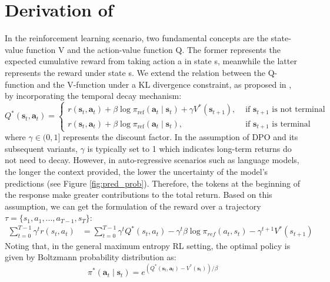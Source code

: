 \section{Derivation of \method}
\label{sec:derivation}
In the reinforcement learning scenario, two fundamental concepts are the state-value function V and the action-value function Q. The former represents the expected cumulative reward from taking action a in state s, meanwhile the latter represents the reward under state s. We extend the relation between the Q-function and the V-function under a KL divergence constraint, as proposed in \citet{rafailov2024fromr}, by incorporating the temporal decay mechanism:
\begin{equation}
    Q^*\left(\mathbf{s}_t, \mathbf{a}_t\right)= \begin{cases}r\left(\mathbf{s}_t, \mathbf{a}_t\right)+\beta \log \pi_{\mathrm{ref}}\left(\mathbf{a}_t \mid \mathbf{s}_t\right)+\gamma V^*\left(\mathbf{s}_{t+1}\right), & \text { if } \mathbf{s}_{t+1} \text { is not terminal } \\ r\left(\mathbf{s}_t, \mathbf{a}_t\right)+\beta \log \pi_{\mathrm{ref}}\left(\mathbf{a}_t \mid \mathbf{s}_t\right), & \text { if } \mathbf{s}_{t+1} \text { is terminal }\end{cases}
\end{equation}
where $\gamma \in (0,1]$ represents the discount factor. In the assumption of DPO and its subsequent variants, $\gamma$ is typically set to 1 which indicates long-term returns do not need to decay. However, in auto-regressive scenarios such as language models, the longer the context provided, the lower the uncertainty of the model's predictions (see Figure \ref{fig:pred_prob}). Therefore, the tokens at the beginning of the response make greater contributions to the total return. Based on this assumption, we can get the formulation of the reward over a trajectory $\tau = \{s_1, a_1, . . . , a_{T-1}, s_T \}$:
\begin{align}
\sum\limits_{t=0}^{T-1}\gamma^tr(s_t, a_t)&=\sum\limits_{t=0}^{T-1}\gamma^tQ^*(s_t, a_t)-\gamma^t\beta \log \pi_{ref}(a_t, s_t) - \gamma^{t+1} V^*(s_{t+1})
\label{eq:decay_reward1}
\end{align}
Noting that, in the general maximum entropy RL setting, the optimal policy is given by Boltzmann probability distribution as:
\begin{equation}
\pi^*\left(\mathbf{a}_t \mid \mathbf{s}_t\right)=e^{\left(Q^*\left(\mathbf{s}_t, \mathbf{a}_t\right)-V^*\left(\mathbf{s}_t\right)\right) / \beta}\label{optimal_policy}
\end{equation}

